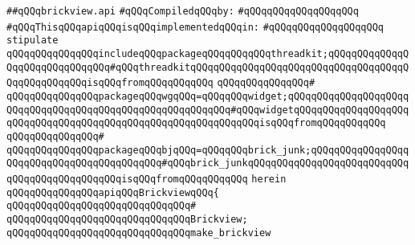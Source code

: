 \label{src/lib/x-kit/tut/badbricks-game/brickview.api}
\verb|##qQQqbrickview.api|\newline
\newline
\verb|#qQQqCompiledqQQqby:|\newline
\verb|#qQQqqQQqqQQqqQQqqQQq|\newline
\newline
\verb|#qQQqThisqQQqapiqQQqisqQQqimplementedqQQqin:|\newline
\verb|#qQQqqQQqqQQqqQQqqQQq|\newline
\newline
\verb|stipulate|\newline
\verb|qQQqqQQqqQQqqQQqincludeqQQqpackageqQQqqQQqqQQqthreadkit;qQQqqQQqqQQqqQQqqQQqqQQqqQQqqQQq#qQQqthreadkitqQQqqQQqqQQqqQQqqQQqqQQqqQQqqQQqqQQqqQQqqQQqqQQqqQQqisqQQqfromqQQqqQQqqQQq|\newline
\verb|qQQqqQQqqQQqqQQq#|\newline
\verb|qQQqqQQqqQQqqQQqpackageqQQqwgqQQq=qQQqqQQqwidget;qQQqqQQqqQQqqQQqqQQqqQQqqQQqqQQqqQQqqQQqqQQqqQQqqQQqqQQqqQQq#qQQqwidgetqQQqqQQqqQQqqQQqqQQqqQQqqQQqqQQqqQQqqQQqqQQqqQQqqQQqqQQqqQQqqQQqisqQQqfromqQQqqQQqqQQq|\newline
\verb|qQQqqQQqqQQqqQQq#|\newline
\verb|qQQqqQQqqQQqqQQqpackageqQQqbjqQQq=qQQqqQQqbrick_junk;qQQqqQQqqQQqqQQqqQQqqQQqqQQqqQQqqQQqqQQqqQQq#qQQqbrick_junkqQQqqQQqqQQqqQQqqQQqqQQqqQQqqQQqqQQqqQQqqQQqqQQqisqQQqfromqQQqqQQqqQQq|\newline
\verb|herein|\newline
\newline
\verb|qQQqqQQqqQQqqQQqapiqQQqBrickviewqQQq{|\newline
\verb|qQQqqQQqqQQqqQQqqQQqqQQqqQQqqQQq#|\newline
\verb|qQQqqQQqqQQqqQQqqQQqqQQqqQQqqQQqBrickview;|\newline
\newline
\verb|qQQqqQQqqQQqqQQqqQQqqQQqqQQqqQQqmake_brickview|\newline
